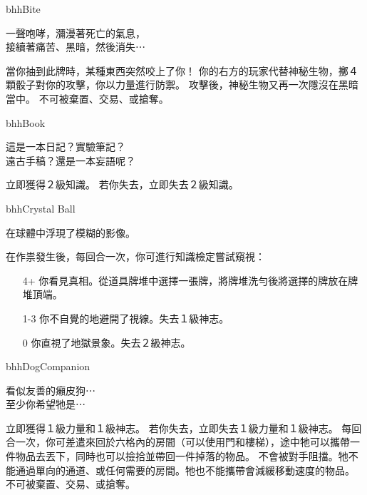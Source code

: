 %
\begin{OmenCard}{bhh}{Bite}{}
  \begin{CardStory}
    一聲咆哮，瀰漫著死亡的氣息，\\
    接續著痛苦、黑暗，然後消失⋯
  \end{CardStory}
  當你抽到此牌時，某種東西突然咬上了你！\smallbreak
  你的右方的玩家代替神秘生物，擲４顆骰子對你的攻擊，你以力量進行防禦。\smallbreak
  攻擊後，神秘生物又再一次隱沒在黑暗當中。\smallbreak
  \ThisName{}不可被棄置、交易、或搶奪。\smallbreak
\end{OmenCard}%
\linebreak[0]%
\begin{OmenCard}{bhh}{Book}{}
  \begin{CardStory}
    這是一本日記？實驗筆記？\\
    遠古手稿？還是一本妄語呢？
  \end{CardStory}
  立即獲得２級知識。\smallbreak
  若你失去\ThisName{}，立即失去２級知識。\smallbreak
\end{OmenCard}%
\linebreak[0]%
\begin{OmenCard}{bhh}{Crystal Ball}{}
  \begin{CardStory}
    在球體中浮現了模糊的影像。
  \end{CardStory}
  在作祟發生後，每回合一次，你可進行知識檢定嘗試窺視\ThisName{}：
  \begin{itemize}
    \item[4+] 你看見真相。從道具牌堆中選擇一張牌，將牌堆洗勻後將選擇的牌放在牌堆頂端。
    \item[1-3] 你不自覺的地避開了視線。失去１級神志。
    \item[0] 你直視了地獄景象。失去２級神志。
  \end{itemize}
\end{OmenCard}%
\linebreak[0]%
\begin{OmenCard}{bhh}{Dog}{Companion}
  \begin{CardStory}
    看似友善的癩皮狗⋯\\
    至少你希望牠是⋯
  \end{CardStory}
  立即獲得１級力量和１級神志。\smallbreak
  若你失去\ThisName{}，立即失去１級力量和１級神志。\smallbreak
  每回合一次，你可差遣\ThisName{}來回於六格內的房間（可以使用門和樓梯），途中牠可以攜帶一件物品去丟下，同時也可以撿拾並帶回一件掉落的物品。\smallbreak
  \ThisName{}不會被對手阻擋。牠不能通過單向的通道、或任何需要\RollAny{}的房間。牠也不能攜帶會減緩移動速度的物品。\smallbreak
  \ThisName{}不可被棄置、交易、或搶奪。\smallbreak
\end{OmenCard}%
